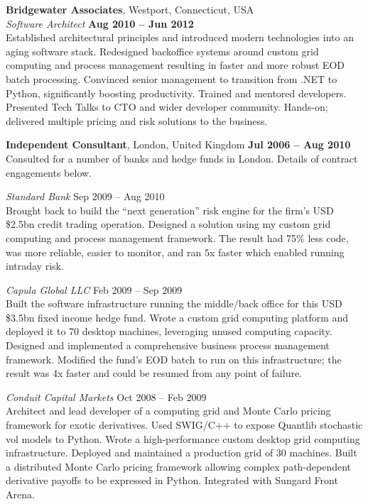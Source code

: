 \documentclass[margin,line]{resume}
\begin{document}
\begin{resume}
    \textbf{Bridgewater Associates}, Westport, Connecticut, USA \vspace{2mm}\\\vspace{1mm}%
    \textsl{Software Architect} \hfill \textbf{Aug 2010 -- Jun 2012}\\
    Established architectural principles and introduced modern technologies into an aging software stack. 
    Redesigned backoffice systems around custom grid computing and process management resulting in faster and more 
    robust EOD batch processing. Convinced senior management to transition from .NET to Python, significantly boosting productivity. 
    Trained and mentored developers. Presented Tech Talks to CTO and wider developer community. Hands-on; delivered 
    multiple pricing and risk solutions to the business. 

	\textbf{Independent Consultant}, London, United Kingdom \hfill \textbf{Jul 2006 -- Aug 2010}\vspace{2mm}\\\vspace{1mm}%
    Consulted for a number of banks and hedge funds in London. Details of contract engagements below.\vspace{0mm}

    \textsl{Standard Bank} \hfill Sep 2009 -- Aug 2010\\
    Brought back to build the ``next generation'' risk engine for the firm's USD \$2.5bn credit trading operation. Designed a
    solution using my custom grid computing and process management framework. The result had 75\% less code, was more reliable,
    easier to monitor, and ran 5x faster which enabled running intraday risk.

    \textsl{Capula Global LLC} \hfill Feb 2009 -- Sep 2009\\
    Built the software infrastructure running the middle/back office for this USD \$3.5bn fixed income hedge fund.
    Wrote a custom grid computing platform and deployed it to 70 desktop machines, leveraging unused computing capacity. 
    Designed and implemented a comprehensive business process management framework. Modified the
    fund's EOD batch to run on this infrastructure; the result was 4x faster and could be resumed from any point of failure.
    
    \vspace{5cm}
    \textsl{Conduit Capital Markets} \hfill Oct 2008 -- Feb 2009\\
   	Architect and lead developer of a computing grid and Monte Carlo pricing framework for exotic derivatives. Used SWIG/C++
   	to expose Quantlib stochastic vol models to Python. Wrote a
    high-performance custom desktop grid computing infrastructure. Deployed and maintained a production grid of 30 machines.
	Built a distributed Monte Carlo pricing framework allowing complex path-dependent derivative payoffs
    to be expressed in Python. Integrated with Sungard Front Arena. 
    

\end{resume}
\end{document}

